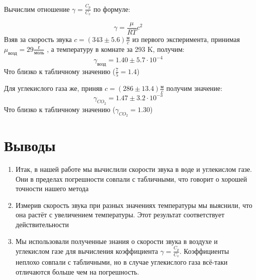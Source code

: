 \documentclass{article}
\begin{document}
Вычислим отношение $\gamma = \frac{C_p}{C_v}$ по формуле:

\[ \gamma = \frac{\mu}{RT}c^2 \]
Взяв за скорость звука $c = (343 \pm 5.6) \frac{\text{м}}{c}$ из первого эксперимента, принимая $\mu_{\text{возд}} = 29 \frac{\text{г}}{\text{моль}}$ 
, а температуру в комнате за 293 K, получим:
\[ \gamma_{\text{возд}} = 1.40 \pm 5.7\cdot10^{-4}\]
Что близко к табличному значению ($\frac{7}{5} = 1.4$)

Для углекислого газа же, приняв $c = (286 \pm 13.4) \frac{\text{м}}{c}$ получим значение:
\[ \gamma_{CO_2} = 1.47 \pm 3.2\cdot 10^{-3} \]
Что близко к табличному значению ($\gamma_{CO_2} = 1.30$)
\section{Выводы}

\begin{enumerate}
    \item Итак, в нашей работе мы вычислили скорости звука в воде и углекислом газе. Они в пределах погрешности совпали с табличными,
    что говорит о хорошей точности нашего метода
    \item Измерив скорость звука при разных значениях температуры мы выяснили, что она растёт с увеличением температуры. Этот результат 
    соответствует действительности
    \item Мы использовали полученные знания о скорости звука в воздухе и углекислом газе для вычисления
    коэффициента $\gamma = \frac{C_p}{C_v}$. Коэффициенты неплохо совпали с табличными, но в случае углекислого газа всё-таки отличаются 
    больше чем на погрешность.
\end{enumerate}
\end{document}
